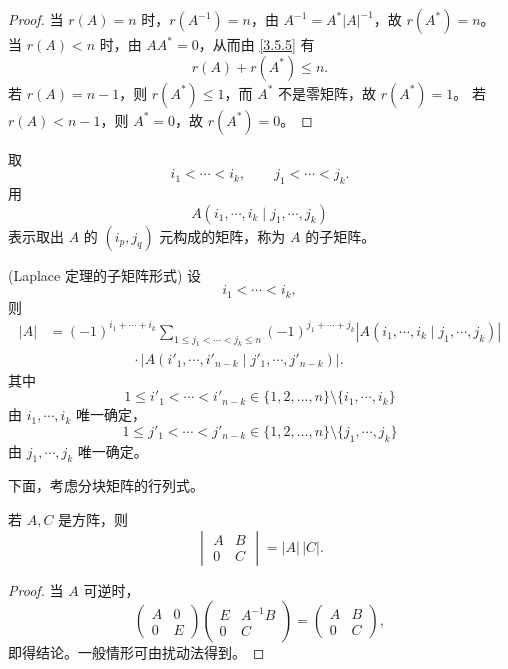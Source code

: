 \begin{proof}
	当 $r(A)=n$ 时，$r(A^{-1})=n$，由 $A^{-1}=A^*|A|^{-1}$，故 $r(A^*)=n$。
	当 $r(A)<n$ 时，由 $AA^*=0$，从而由 \ref{3.5.5} 有
	\[
	r(A)+r(A^*)\leq n.
	\]
	若 $r(A)=n-1$，则 $r(A^*)\leq1$，而 $A^*$ 不是零矩阵，故 $r(A^*)=1$。
	若 $r(A)<n-1$，则 $A^*=0$，故 $r(A^*)=0$。
\end{proof}

\begin{definition}\label{3.8.9}
	取
	\[
	i_1<\cdots<i_k,
	\qquad
	j_1<\cdots<j_k.
	\]
	用
	\[
	A(i_1,\cdots,i_k\mid j_1,\cdots,j_k)
	\]
	表示取出 $A$ 的 $(i_p,j_q)$ 元构成的矩阵，称为 $A$ 的子矩阵。
\end{definition}

\begin{theorem}(Laplace 定理的子矩阵形式)\label{3.8.10}
	设
	\[
	i_1<\cdots<i_k,
	\]
	则
	\[
	\begin{aligned}
		|A|
		&=(-1)^{i_1+\cdots+i_k}
		\sum_{1\leq j_1<\cdots<j_k\leq n}
		(-1)^{j_1+\cdots+j_k}
		\left|A(i_1,\cdots,i_k\mid j_1,\cdots,j_k)\right|\\
		&\qquad\qquad\qquad\cdot
		\left|A(i'_1,\cdots,i'_{n-k}\mid j'_1,\cdots,j'_{n-k})\right|.
	\end{aligned}
	\]
	其中
	\[
	1\leq i'_1<\cdots<i'_{n-k}\in\{1,2,\ldots,n\}\setminus\{i_1,\cdots,i_k\}
	\]
	由 $i_1,\cdots,i_k$ 唯一确定，
	\[
	1\leq j'_1<\cdots<j'_{n-k}\in\{1,2,\ldots,n\}\setminus\{j_1,\cdots,j_k\}
	\]
	由 $j_1,\cdots,j_k$ 唯一确定。
\end{theorem}

下面，考虑分块矩阵的行列式。

\begin{proposition}\label{3.8.11}
	若 $A,C$ 是方阵，则
	\[
	\begin{vmatrix}
		A&B\\
		0&C
	\end{vmatrix}
	=|A|\,|C|.
	\]
\end{proposition}

\begin{proof}
	当 $A$ 可逆时，
	\[
	\begin{pmatrix}
		A&0\\
		0&E
	\end{pmatrix}
	\begin{pmatrix}
		E&A^{-1}B\\
		0&C
	\end{pmatrix}
	=
	\begin{pmatrix}
		A&B\\
		0&C
	\end{pmatrix},
	\]
	即得结论。一般情形可由扰动法得到。
\end{proof}

